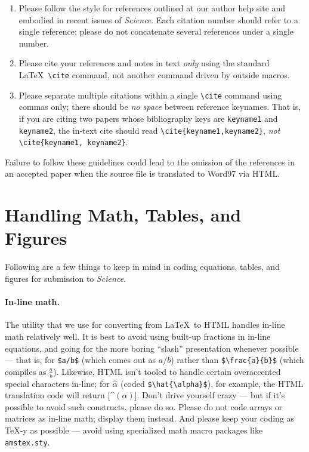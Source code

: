 \documentclass[12pt]{article}
\begin{document}
\begin{enumerate}
\item Please follow the style for references outlined at our author
  help site and embodied in recent issues of {\it Science}.  Each
  citation number should refer to a single reference; please do not
  concatenate several references under a single number.
\item Please cite your references and notes in text {\it only\/} using
  the standard \LaTeX\ \verb+\cite+ command, not another command
  driven by outside macros.
\item Please separate multiple citations within a single \verb+\cite+
  command using commas only; there should be {\it no space\/}
  between reference keynames.  That is, if you are citing two
  papers whose bibliography keys are \texttt{keyname1} and
  \texttt{keyname2}, the in-text cite should read
  \verb+\cite{keyname1,keyname2}+, {\it not\/}
  \verb+\cite{keyname1, keyname2}+.
\end{enumerate}

\noindent Failure to follow these guidelines could lead
to the omission of the references in an accepted paper when the source
file is translated to Word97 via HTML.

\section*{Handling Math, Tables, and Figures}

Following are a few things to keep in mind in coding equations,
tables, and figures for submission to {\it Science}.

\paragraph*{In-line math.}  The utility that we use for converting
from \LaTeX\ to HTML handles in-line math relatively well.  It is best
to avoid using built-up fractions in in-line equations, and going for
the more boring ``slash'' presentation whenever possible --- that is,
for \verb+$a/b$+ (which comes out as $a/b$) rather than
\verb+$\frac{a}{b}$+ (which compiles as $\frac{a}{b}$).  Likewise,
HTML isn't tooled to handle certain overaccented special characters
in-line; for $\hat{\alpha}$ (coded \verb+$\hat{\alpha}$+), for
example, the HTML translation code will return [\^{}$(\alpha)$].
Don't drive yourself crazy --- but if it's possible to avoid such
constructs, please do so.  Please do not code arrays or matrices as
in-line math; display them instead.  And please keep your coding as
\TeX-y as possible --- avoid using specialized math macro packages
like \texttt{amstex.sty}.
\end{document}
